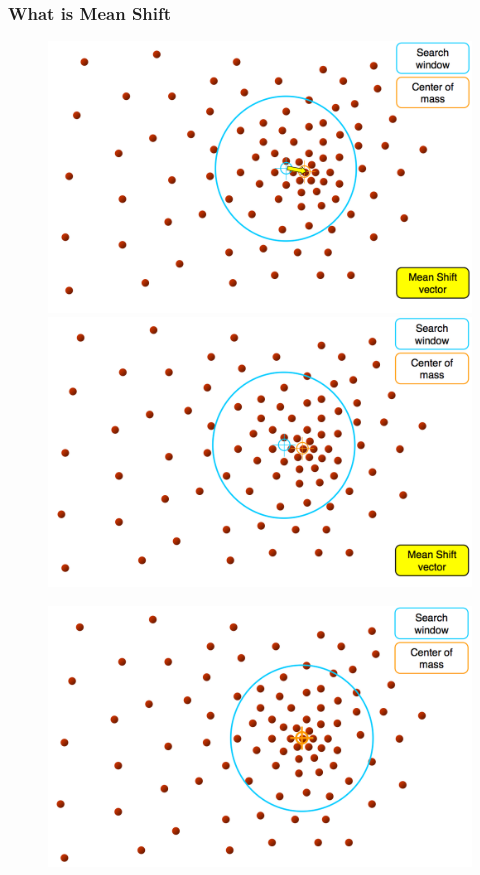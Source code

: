 \documentclass[notheorems,serif,table,compress]{beamer}  %
\begin{document}
\begin{frame}
\frametitle{What is Mean Shift}
    \begin{figure}
      \begin{minipage}[t]{0.45\linewidth}
      \includegraphics[width=1\linewidth]{meanshift5.png} 
      \end{minipage}
      \pause
      \begin{minipage}[t]{0.45\linewidth}
      \includegraphics[width=1\linewidth]{meanshift6.png} 
      \end{minipage}
    \end{figure}
    \pause
    \begin{figure}
      \includegraphics[width=0.45\linewidth]{meanshift7.png} 
    \end{figure}
\end{frame}
\end{document}
